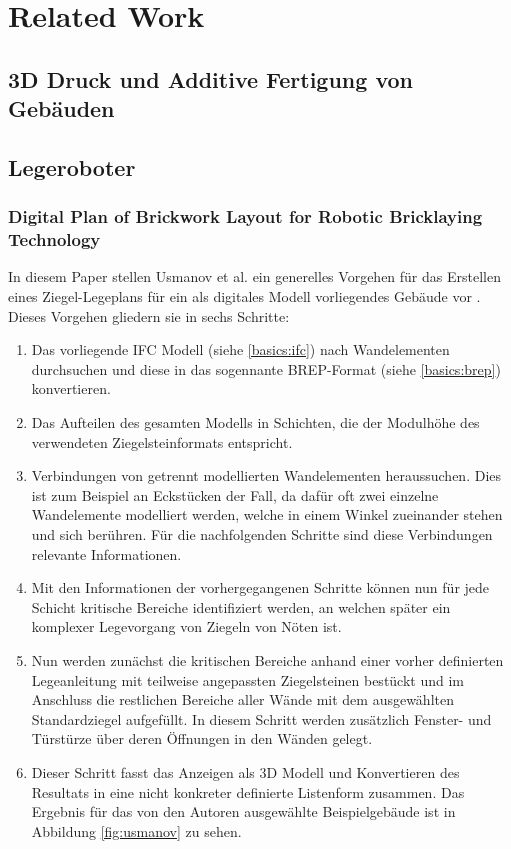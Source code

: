 \chapter{Related Work} \label{related}
\section{3D Druck und Additive Fertigung von Gebäuden}
\section{Legeroboter}
\subsection{Digital Plan of Brickwork Layout for Robotic Bricklaying Technology}\label{related:digital_plan_of_brickwork_layout}
In diesem Paper stellen Usmanov et al. ein generelles Vorgehen für das Erstellen eines Ziegel-Legeplans für ein als digitales Modell vorliegendes Gebäude vor \cite{Usmanov2021}.
Dieses Vorgehen gliedern sie in sechs Schritte:
\begin{enumerate}
\item Das vorliegende IFC Modell (siehe \ref{basics:ifc}) nach Wandelementen durchsuchen und diese in das sogennante BREP-Format (siehe \ref{basics:brep}) konvertieren.
\item Das Aufteilen des gesamten Modells in Schichten, die der Modulhöhe des verwendeten Ziegelsteinformats entspricht.
\item Verbindungen von getrennt modellierten Wandelementen heraussuchen. Dies ist zum Beispiel an Eckstücken der Fall, da dafür oft zwei einzelne Wandelemente modelliert werden, welche in einem Winkel zueinander stehen und sich berühren. Für die nachfolgenden Schritte sind diese Verbindungen relevante Informationen.
\item  Mit den Informationen der vorhergegangenen Schritte können nun für jede Schicht kritische Bereiche identifiziert werden, an welchen später ein komplexer Legevorgang von Ziegeln von Nöten ist.
\item  Nun werden zunächst die kritischen Bereiche anhand einer vorher definierten Legeanleitung mit teilweise angepassten Ziegelsteinen bestückt und im Anschluss die restlichen Bereiche aller Wände mit dem ausgewählten Standardziegel aufgefüllt. In diesem Schritt werden zusätzlich Fenster- und Türstürze über deren Öffnungen in den Wänden gelegt.
\item Dieser Schritt fasst das Anzeigen als 3D Modell und Konvertieren des Resultats in eine nicht konkreter definierte Listenform zusammen. Das Ergebnis für das von den Autoren ausgewählte Beispielgebäude ist in Abbildung \ref{fig:usmanov} zu sehen.
\end{enumerate}

